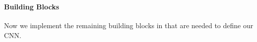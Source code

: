 \begin{code}[hide]
%
\>[2]\AgdaSpace{}%
\AgdaSpace{}%
\AgdaSymbol{(}\AgdaSpace{}%
\AgdaSymbol{)}\AgdaSpace{}%
\AgdaSymbol{=}\AgdaSpace{}%
\AgdaSpace{}%
\AgdaSymbol{(}\AgdaSpace{}%
\AgdaSpace{}%
\AgdaSymbol{)}\<%
\\
%
\>[2]\AgdaSpace{}%
\AgdaSpace{}%
\AgdaSymbol{(}\AgdaSpace{}%
\AgdaSymbol{)}\AgdaSpace{}%
\AgdaSymbol{=}\AgdaSpace{}%
\AgdaSpace{}%
\AgdaSymbol{(}\AgdaSpace{}%
\AgdaSpace{}%
\AgdaSymbol{)}\<%
\end{code}


\paragraph{Building Blocks}
Now we implement the remaining building blocks in  that are needed
to define our CNN.
